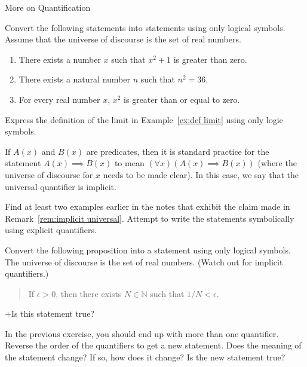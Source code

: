\begin{section}{More on Quantification}
\begin{example}
\begin{enumerate}
\end{enumerate}
\end{example}

\begin{exercise} Convert the following statements into statements using only logical symbols.  Assume that the universe of discourse is the set of real numbers.
\begin{enumerate}
\item There exists a number $x$ such that $x^2+1$ is greater than zero.
\item There exists a natural number $n$ such that $n^2=36$. 
\item For every real number $x$, $x^2$ is greater than or equal to zero.
\end{enumerate}
\end{exercise}

\begin{exercise}
Express the definition of the limit in Example~\ref{ex:def limit} using only logic symbols.
\end{exercise}

\begin{remark}\label{rem:implicit universal}
If $A(x)$ and $B(x)$ are predicates, then it is standard practice for the statement $A(x)\implies B(x)$ to mean $(\forall x)(A(x)\implies B(x))$ (where the universe of discourse for $x$ needs to be made clear).  In this case, we say that the universal quantifier is implicit.
\end{remark}

\begin{exercise}
Find at least two examples earlier in the notes that exhibit the claim made in Remark~\ref{rem:implicit universal}.  Attempt to write the statements symbolically using explicit quantifiers.
\end{exercise}

\begin{exercise}
Convert the following proposition into a statement using only logical symbols.  The universe of discourse is the set of real numbers.  (Watch out for implicit quantifiers.)
\begin{quote}
If $\epsilon >0$, then there exists $N\in\mathbb{N}$ such that $1/N<\epsilon$.
\end{quote}
+Is this statement true?
\end{exercise}

\begin{exercise}
In the previous exercise, you should end up with more than one quantifier.  Reverse the order of the quantifiers to get a new statement.  Does the meaning of the statement change?  If so, how does it change?  Is the new statement true?
\end{exercise}


\end{section}
